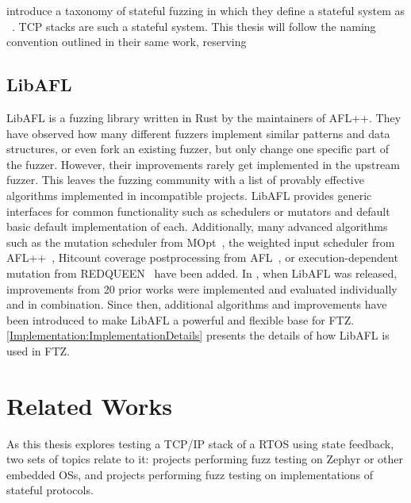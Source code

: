 \documentclass[twocolumn]{article}
\newcommand{\proj}{FTZ\xspace}
\let\savedCite=\cite
\renewcommand{\cite}{\unskip~\savedCite}
\begin{document}
\citeauthor{StatefulReview} introduce a taxonomy of stateful fuzzing in which they define a stateful system as \cite{StatefulReview}. TCP stacks are such a stateful system. This thesis will follow the naming convention outlined in their same work, reserving \cite{StatefulReview}

\subsection{LibAFL}

LibAFL is a fuzzing library written in Rust by the maintainers of AFL++. They have observed how many different fuzzers implement similar patterns and data structures, or even fork an existing fuzzer, but only change one specific part of the fuzzer. However,  their improvements rarely get implemented in the upstream fuzzer. This leaves the fuzzing community with a list of provably effective algorithms implemented in incompatible projects. LibAFL provides generic interfaces for common functionality such as schedulers or mutators and default basic default implementation of each.
Additionally, many advanced algorithms such as the mutation scheduler from MOpt\cite{MOpt}, the weighted input scheduler from AFL++\cite{AFLPlusPlus}, Hitcount coverage postprocessing from AFL\cite{AFL}, or execution-dependent mutation from REDQUEEN\cite{REDQUEEN} have been added. In , when LibAFL was released, improvements from 20 prior works were implemented and evaluated individually and in combination. Since then, additional algorithms and improvements have been introduced to make LibAFL a powerful and flexible base for \proj.\cite{LibAFL} \cref{Implementation:ImplementationDetails} presents the details of how LibAFL is used in \proj.


\section{Related Works}
\label{RelatedWorks}

As this thesis explores testing a TCP/IP stack of a RTOS using state feedback, two sets of topics relate to it: projects performing fuzz testing on Zephyr or other embedded OSs, and projects performing fuzz testing on implementations of stateful protocols.
\end{document}
